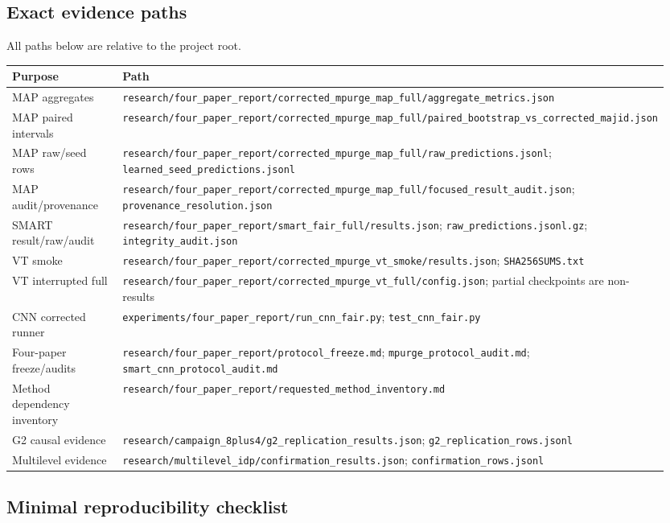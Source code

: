 \documentclass[10pt]{article}
\newcommand{\code}[1]{\nolinkurl{#1}}
\begin{document}
\subsection{Exact evidence paths}

All paths below are relative to the project root.
\footnotesize
\begin{longtable}{@{}p{0.27\linewidth}p{0.68\linewidth}@{}}
\toprule Purpose & Path\\\midrule
MAP aggregates & \code{research/four_paper_report/corrected_mpurge_map_full/aggregate_metrics.json}\\
MAP paired intervals & \code{research/four_paper_report/corrected_mpurge_map_full/paired_bootstrap_vs_corrected_majid.json}\\
MAP raw/seed rows & \code{research/four_paper_report/corrected_mpurge_map_full/raw_predictions.jsonl}; \code{learned_seed_predictions.jsonl}\\
MAP audit/provenance & \code{research/four_paper_report/corrected_mpurge_map_full/focused_result_audit.json}; \code{provenance_resolution.json}\\
SMART result/raw/audit & \code{research/four_paper_report/smart_fair_full/results.json}; \code{raw_predictions.jsonl.gz}; \code{integrity_audit.json}\\
VT smoke & \code{research/four_paper_report/corrected_mpurge_vt_smoke/results.json}; \code{SHA256SUMS.txt}\\
VT interrupted full & \code{research/four_paper_report/corrected_mpurge_vt_full/config.json}; partial checkpoints are non-results\\
CNN corrected runner & \code{experiments/four_paper_report/run_cnn_fair.py}; \code{test_cnn_fair.py}\\
Four-paper freeze/audits & \code{research/four_paper_report/protocol_freeze.md}; \code{mpurge_protocol_audit.md}; \code{smart_cnn_protocol_audit.md}\\
Method dependency inventory & \code{research/four_paper_report/requested_method_inventory.md}\\
G2 causal evidence & \code{research/campaign_8plus4/g2_replication_results.json}; \code{g2_replication_rows.jsonl}\\
Multilevel evidence & \code{research/multilevel_idp/confirmation_results.json}; \code{confirmation_rows.jsonl}\\
\bottomrule
\end{longtable}
\normalsize

\subsection{Minimal reproducibility checklist}
\end{document}
